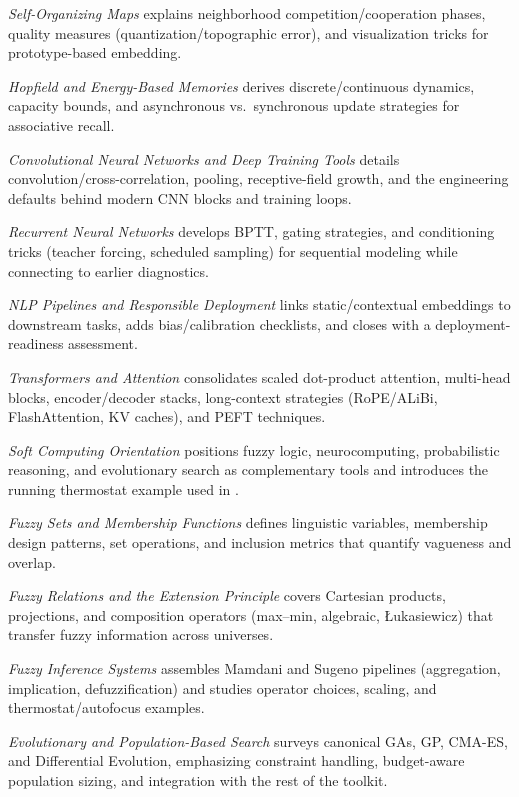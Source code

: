 \begin{sloppypar}
{\begin{description}[leftmargin=3.6cm, labelwidth=3.2cm, labelsep=0.3cm, style=nextline]
\item[\Cref{chap:som}] \textit{Self-Organizing Maps} explains neighborhood competition/cooperation phases, quality measures (quantization/topographic error), and visualization tricks for prototype-based embedding.
\item[\Cref{chap:hopfield}] \textit{Hopfield and Energy-Based Memories} derives discrete/continuous dynamics, capacity bounds, and asynchronous vs.\ synchronous update strategies for associative recall.
\item[\Cref{chap:cnn}] \textit{Convolutional Neural Networks and Deep Training Tools} details convolution/cross-correlation, pooling, receptive-field growth, and the engineering defaults behind modern CNN blocks and training loops.
\item[\Cref{chap:rnn}] \textit{Recurrent Neural Networks} develops BPTT, gating strategies, and conditioning tricks (teacher forcing, scheduled sampling) for sequential modeling while connecting to earlier diagnostics.
\item[\Cref{chap:nlp}] \textit{NLP Pipelines and Responsible Deployment} links static/contextual embeddings to downstream tasks, adds bias/calibration checklists, and closes with a deployment-readiness assessment.
\item[\Cref{chap:transformers}] \textit{Transformers and Attention} consolidates scaled dot-product attention, multi-head blocks, encoder/decoder stacks, long-context strategies (RoPE/ALiBi, FlashAttention, KV caches), and PEFT techniques.
\item[\Cref{chap:softcomp}] \textit{Soft Computing Orientation} positions fuzzy logic, neurocomputing, probabilistic reasoning, and evolutionary search as complementary tools and introduces the running thermostat example used in .
\item[\Cref{chap:fuzzysets}] \textit{Fuzzy Sets and Membership Functions} defines linguistic variables, membership design patterns, set operations, and inclusion metrics that quantify vagueness and overlap.
\item[\Cref{chap:fuzzyrelations}] \textit{Fuzzy Relations and the Extension Principle} covers Cartesian products, projections, and composition operators (max--min, algebraic, \L{}ukasiewicz) that transfer fuzzy information across universes.
\item[\Cref{chap:fuzzyinference}] \textit{Fuzzy Inference Systems} assembles Mamdani and Sugeno pipelines (aggregation, implication, defuzzification) and studies operator choices, scaling, and thermostat/autofocus examples.
\item[\Cref{chap:evo}] \textit{Evolutionary and Population-Based Search} surveys canonical GAs, GP, CMA-ES, and Differential Evolution, emphasizing constraint handling, budget-aware population sizing, and integration with the rest of the toolkit.
\end{description}
}
\end{sloppypar}

